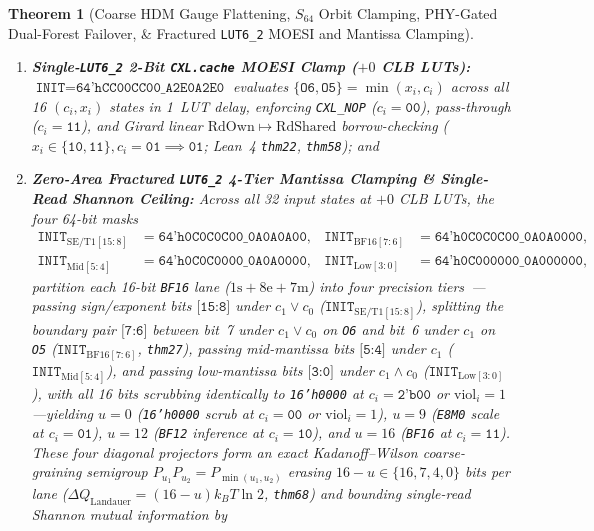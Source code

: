 \documentclass[11pt,letterpaper]{article}
\theoremstyle{spectralthm}
\newtheorem{theorem}{Theorem}[section]
\begin{document}
\begin{theorem}[Coarse HDM Gauge Flattening, $S_{64}$ Orbit Clamping, PHY-Gated Dual-Forest Failover, \& Fractured \texttt{LUT6\_2} MOESI and Mantissa Clamping]
\begin{enumerate}
  \item[(ii)] \textbf{Single-\texttt{LUT6\_2} 2-Bit \texttt{CXL.cache} MOESI Clamp ($+0$ CLB LUTs):} $\texttt{INIT} = \texttt{64'hCC00CC00\_A2E0A2E0}$ evaluates $\{\texttt{O6},\texttt{O5}\} = \min(x_i, c_i)$ across all 16 $(c_i, x_i)$ states in 1~LUT delay, enforcing \texttt{CXL\_NOP} ($c_i=\texttt{00}$), pass-through ($c_i=\texttt{11}$), and Girard linear $\mathrm{RdOwn} \mapsto \mathrm{RdShared}$ borrow-checking ($x_i \in \{\texttt{10},\texttt{11}\}, c_i=\texttt{01} \implies \texttt{01}$; Lean~4 \texttt{thm22}, \texttt{thm58}); and
  \item[(iii)] \textbf{Zero-Area Fractured \texttt{LUT6\_2} 4-Tier Mantissa Clamping \& Single-Read Shannon Ceiling:} Across all 32 input states at $+0$ CLB LUTs, the four 64-bit masks
  \begin{equation}
  \label{eq:graduated_init}
  \begin{aligned}
  \texttt{INIT}_{\mathrm{SE/T1}[15:8]} &= \texttt{64'h0C0C0C00\_0A0A0A00}, &
  \texttt{INIT}_{\mathrm{BF16}[7:6]} &= \texttt{64'h0C0C0C00\_0A0A0000}, \\
  \texttt{INIT}_{\mathrm{Mid}[5:4]} &= \texttt{64'h0C0C0000\_0A0A0000}, &
  \texttt{INIT}_{\mathrm{Low}[3:0]} &= \texttt{64'h0C000000\_0A000000},
  \end{aligned}
  \end{equation}
  partition each 16-bit \texttt{BF16} lane ($1\mathrm{s} + 8\mathrm{e} + 7\mathrm{m}$) into four precision tiers~\cite{rouhani2023microscaling}---passing sign/exponent bits $\texttt{[15:8]}$ under $c_1 \vee c_0$ ($\texttt{INIT}_{\mathrm{SE/T1}[15:8]}$), splitting the boundary pair $\texttt{[7:6]}$ between bit~7 under $c_1 \vee c_0$ on \texttt{O6} and bit~6 under $c_1$ on \texttt{O5} ($\texttt{INIT}_{\mathrm{BF16}[7:6]}$, \texttt{thm27}), passing mid-mantissa bits $\texttt{[5:4]}$ under $c_1$ ($\texttt{INIT}_{\mathrm{Mid}[5:4]}$), and passing low-mantissa bits $\texttt{[3:0]}$ under $c_1 \wedge c_0$ ($\texttt{INIT}_{\mathrm{Low}[3:0]}$), with all 16 bits scrubbing identically to \texttt{16'h0000} at $c_i = \texttt{2'b00}$ or $\mathrm{viol}_i = 1$---yielding $u = 0$ (\texttt{16'h0000} scrub at $c_i=\texttt{00}$ or $\mathrm{viol}_i=1$), $u = 9$ (\texttt{E8M0} scale at $c_i=\texttt{01}$), $u = 12$ (\texttt{BF12} inference at $c_i=\texttt{10}$), and $u = 16$ (\texttt{BF16} at $c_i=\texttt{11}$). These four diagonal projectors form an exact Kadanoff--Wilson coarse-graining semigroup $P_{u_1}P_{u_2} = P_{\min(u_1,u_2)}$ erasing $16 - u \in \{16, 7, 4, 0\}$ bits per lane ($\Delta Q_{\mathrm{Landauer}} = (16-u)k_B T\ln 2$, \texttt{thm68}) and bounding single-read Shannon mutual information by

\end{enumerate}
\end{theorem}
\end{document}
